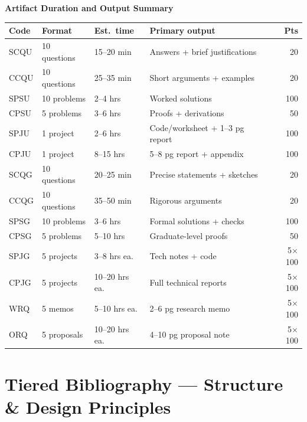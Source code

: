 \documentclass[11pt,a4paper]{article}
\begin{document}
\bigskip
\begin{center}
{\large\textbf{Artifact Duration and Output Summary}}\\[8pt]
\begin{tabular}{llllr}
\toprule
\textbf{Code} & \textbf{Format} & \textbf{Est.\ time} & \textbf{Primary output} & \textbf{Pts}\\
\midrule
SCQU & 10 questions & 15--20 min  & Answers + brief justifications & 20\\
CCQU & 10 questions & 25--35 min  & Short arguments + examples     & 20\\
SPSU & 10 problems  & 2--4 hrs    & Worked solutions               & 100\\
CPSU & 5 problems   & 3--6 hrs    & Proofs + derivations           & 50\\
SPJU & 1 project    & 2--6 hrs    & Code/worksheet + 1--3 pg report& 100\\
CPJU & 1 project    & 8--15 hrs   & 5--8 pg report + appendix      & 100\\
\midrule
SCQG & 10 questions & 20--25 min  & Precise statements + sketches  & 20\\
CCQG & 10 questions & 35--50 min  & Rigorous arguments             & 20\\
SPSG & 10 problems  & 3--6 hrs    & Formal solutions + checks      & 100\\
CPSG & 5 problems   & 5--10 hrs   & Graduate-level proofs          & 50\\
SPJG & 5 projects   & 3--8 hrs ea.& Tech notes + code              & 5$\times$100\\
CPJG & 5 projects   & 10--20 hrs ea.& Full technical reports       & 5$\times$100\\
\midrule
WRQ  & 5 memos      & 5--10 hrs ea. & 2--6 pg research memo       & 5$\times$100\\
ORQ  & 5 proposals  & 10--20 hrs ea.& 4--10 pg proposal note      & 5$\times$100\\
\bottomrule
\end{tabular}
\end{center}

\newpage
\section{Tiered Bibliography --- Structure \& Design Principles}
\label{sec:bibdesign}
\end{document}

